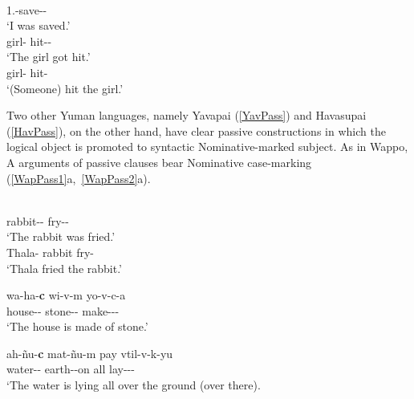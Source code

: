 \begin{exe}\ex\label{MojPass}
\begin{xlist}
\ex\gll {}\\
1.\obj{}-save-\pass{}-\tns{}\\
\glt `I was saved.' 
\ex\gll {} \\
girl-\dem{} hit-\pass{}-\tns{}\\
\glt `The girl got hit.' 
\ex\gll {} \\
girl-\dem{} hit-\tns{}\\
\glt `(Someone) hit the girl.'
\end{xlist}
\end{exe}


Two other Yuman languages, namely Yavapai (\ref{YavPass}) and Havasupai (\ref{HavPass}), %
on the other hand, have clear passive constructions in which the logical object is promoted to syntactic Nominative-marked  subject.
As in Wappo, A arguments of passive clauses bear Nominative  case-marking (\ref{WapPass1}a,~\ref{WapPass2}a).

\begin{exe}\ex\label{YavPass}
\begin{xlist}
\ex\gll{} \\
rabbit-\dem{}-\nom{}  fry-\pass{}-\compl{}\\
\glt `The rabbit was fried.' 
\ex\gll {}  \\
Thala-\nom{} rabbit fry-\compl{}\\
\glt `Thala fried the rabbit.'
\end{xlist}
\end{exe}

\begin{exe}\ex\label{HavPass}
\begin{xlist}
\ex\gll wa-ha-\textbf{c} wi-v-m yo-v-c-a\\
house-\dem{}-\nom{} stone-\dem{}-\prtv{} make-\pass{}-\pl{}-\modal{}\\
\glt `The house is made of stone.' 

\ex\gll ah-\~nu-\textbf{c} mat-\~nu-m pay vtil-v-k-yu\\
water-\dem{}-\nom{} earth-\dem{}-on all lay-\pass{}-\ind{}-\aux{}\\
\glt `The water is lying all over the ground (over there). %
\end{xlist}
\end{exe}

